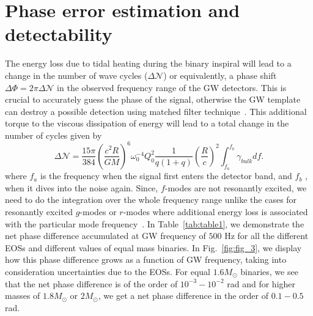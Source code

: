 \documentclass[%
 reprint,
 amsmath,amssymb,
 aps,
]{revtex4-2}
\begin{document}
\section{Phase error estimation and detectability}
\label{sec:phase}
The energy loss due to tidal heating during the binary inspiral will lead to a change in the number of wave cycles ($\Delta\mathcal{N}$) or equivalently, a phase shift $\Delta\Phi = 2\pi\Delta\mathcal{N}$ in the observed frequency range of the GW detectors. This is crucial to accurately guess the phase of the signal, otherwise the GW template can destroy a possible detection using matched filter technique~\cite{Matchfilter_2008}. This additional torque to the viscous dissipation of energy will lead to a total change in the number of cycles given by
\begin{equation}\label{eq:error}
   \Delta\mathcal{N}  = \frac{15\pi}{384}\left(\frac{c^2R}{GM}\right)^6 \omega_0^{-4}Q_0^2\frac{1}{q(1+q)}\left(\frac{R}{c}\right)^2\int_{f_a}^{f_b} \gamma_{bulk} df.    
\end{equation}
where $f_a$ is the frequency when the signal first enters the detector band, and $f_b$ , when it dives into the noise again. Since, $f$-modes are not resonantly excited, we need to do the integration over the whole frequency range unlike the cases for resonantly excited $g$-modes or $r$-modes where additional energy loss is associated with the particular mode frequency~\cite{Andersson_2018,Ma2021}. In Table~\ref{tab:table1}, we demonstrate the net phase difference accumulated at GW frequency of $500$ Hz for all the different EOSs and different values of equal mass binaries. In Fig.~\ref{fig:fig_3}, we display how this phase difference grows as a function of GW frequency, taking into consideration uncertainties due to the EOSs. For equal $1.6M_{\odot}$ binaries, we see that the net phase difference is of the order of $10^{-3} - 10^{-2}$ rad and for higher masses of $1.8M_{\odot}$ or $2M_{\odot}$, we get a net phase difference in the order of $0.1-0.5$ rad. \\
\end{document}

